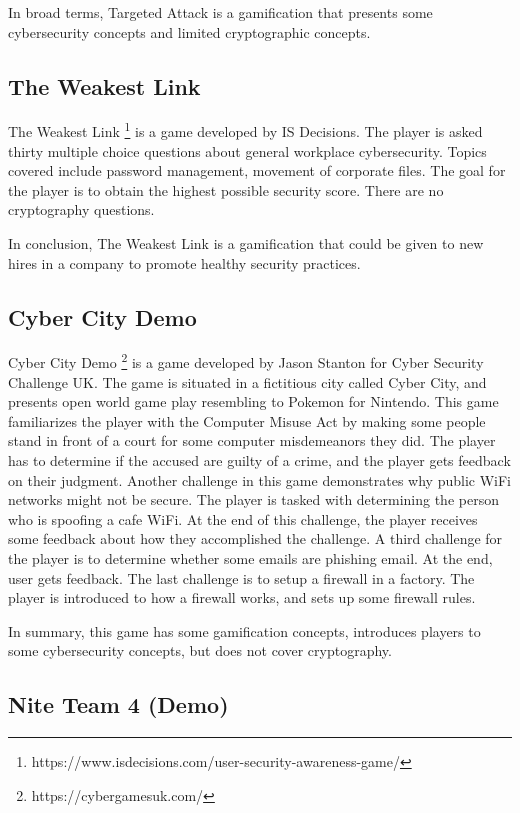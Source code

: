 \documentclass{l4proj}
\begin{document}
In broad terms, Targeted Attack is a gamification that presents some cybersecurity concepts and limited cryptographic concepts.

\subsection{The Weakest Link}

The Weakest Link \footnote{https://www.isdecisions.com/user-security-awareness-game/} is a game developed by IS Decisions. The player is asked thirty multiple choice questions about general workplace cybersecurity.
Topics covered include password management, movement of corporate files. The goal for the player is to obtain the highest possible security score.
There are no cryptography questions.

In conclusion, The Weakest Link is a gamification that could be given to new hires in a company to promote healthy security practices.

\subsection{Cyber City Demo}

Cyber City Demo \footnote{https://cybergamesuk.com/} is a game developed by Jason Stanton for Cyber Security Challenge UK.
The game is situated in a fictitious city called Cyber City, and presents open world game play resembling to Pokemon for Nintendo.
This game familiarizes the player with the Computer Misuse Act by making some people stand in front of a court for some computer misdemeanors they did.
The player has to determine if the accused are guilty of a crime, and the player gets feedback on their judgment.
Another challenge in this game demonstrates why public WiFi networks might not be secure. The player is tasked with determining the person who is spoofing a cafe WiFi.
At the end of this challenge, the player receives some feedback about how they accomplished the challenge.
A third challenge for the player is to determine whether some emails are phishing email. At the end, user gets feedback.
The last challenge is to setup a firewall in a factory. The player is introduced to how a firewall works, and sets up some firewall rules.

In summary, this game has some gamification concepts, introduces players to some cybersecurity concepts, but does not cover cryptography.

\subsection{Nite Team 4 (Demo)}
\end{document}
